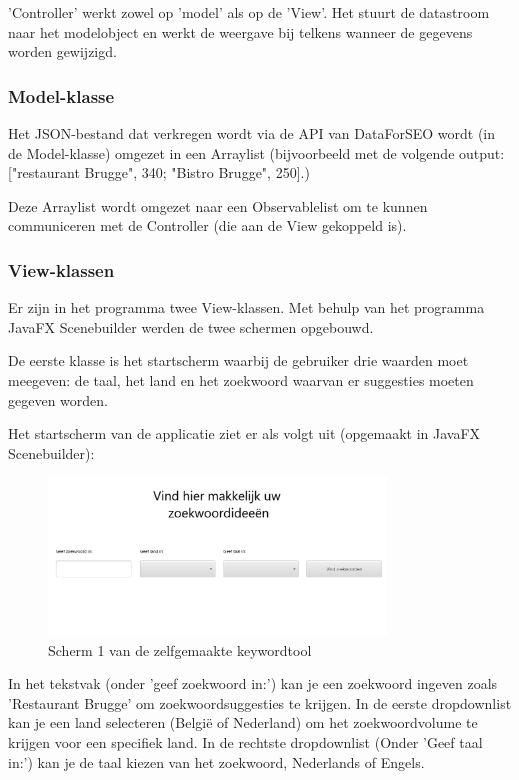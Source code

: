 'Controller' werkt zowel op 'model' als op de 'View'. Het stuurt de datastroom naar het modelobject en werkt de weergave bij telkens wanneer de gegevens worden gewijzigd.

\subsubsection{Model-klasse}
\label{ch: Model-klasse}

Het JSON-bestand dat verkregen wordt via de API van DataForSEO wordt (in de Model-klasse) omgezet in een Arraylist (bijvoorbeeld met de volgende output: ["restaurant Brugge", 340; "Bistro Brugge", 250].)

Deze Arraylist wordt omgezet naar een Observablelist om te kunnen communiceren met de Controller (die aan de View gekoppeld is). 

\subsubsection{View-klassen}
\label{ch: View-klassen}

Er zijn in het programma twee View-klassen. Met behulp van het programma JavaFX Scenebuilder werden de twee schermen opgebouwd.

De eerste klasse is het startscherm waarbij de gebruiker drie waarden moet meegeven: de taal, het land en het zoekwoord waarvan er suggesties moeten gegeven worden. 

Het startscherm van de applicatie ziet er als volgt uit (opgemaakt in JavaFX Scenebuilder): 

\begin{figure}[h!]
\centering
\includegraphics[width=0.8\textwidth]{img/keywordtoolscherm1.PNG}
\caption{Scherm 1 van de zelfgemaakte keywordtool}
\end{figure}

In het tekstvak (onder 'geef zoekwoord in:') kan je een zoekwoord ingeven zoals 'Restaurant Brugge' om zoekwoordsuggesties te krijgen. In de eerste dropdownlist kan je een land selecteren (België of Nederland) om het zoekwoordvolume te krijgen voor een specifiek land. In de rechtste dropdownlist (Onder 'Geef taal in:') kan je de taal kiezen van het zoekwoord, Nederlands of Engels. 

